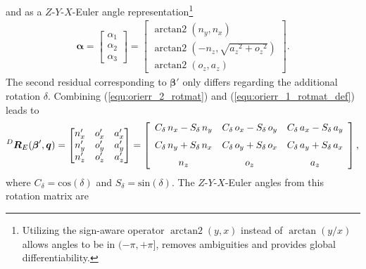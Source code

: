\documentclass[robotics,article,submit,moreauthors,pdftex]{Definitions/mdpi}
\newcommand{\bm}[1]{\boldsymbol{#1}}
\DeclareMathOperator{\arctantwo}{arctan2}
\newcommand{\rotmat}[2]{{{ }^{#1}\boldsymbol{R}}_{#2}}
\begin{document}
%
and as a $Z$-$Y$-$X$-Euler angle representation\footnote{Utilizing the sign-aware operator $\arctantwo(y,x)$ instead of $\arctan(y/x)$ allows angles to be in $(-\pi,+\pi]$, removes ambiguities and provides global differentiability.}
%
\begin{align}
    \bm{\alpha}
	=
	\begin{bmatrix}
	\alpha_1 \\
	\alpha_2 \\
	\alpha_3
    \end{bmatrix}
	=
    \begin{bmatrix}
        \arctantwo \left( {n_y} , { n_x} \right) \\ 
        \arctantwo \left( -{n_z} , \sqrt {{{a_z}}^{2}+{{ o_z}}^{2}} \right) \\ 
        \arctantwo \left( {o_z} , {a_z} \right)
    \end{bmatrix}.
    \label{equ:alpha_zyx}
\end{align}
%
The second residual corresponding to $\bm{\beta}'$ only differs regarding the additional rotation $\delta$. Combining (\ref{equ:orierr_2_rotmat}) and (\ref{equ:orierr_1_rotmat_def}) leads to
%
\begin{align}
    \rotmat{D}{E}(\bm{\beta}',\bm{q})
    =
    \begin{bmatrix}
    {n'_x}&{o'_x}&{a'_x} \\
    {n'_y}&{o'_y}&{a'_y} \\ 
    {n'_z}&{o'_z}&{a'_z} \\ 
    \end{bmatrix}
    = 
    \left[ \begin {array}{ccc} { C_{\delta}}\,{n_x}-{ S_{\delta}}\,{ n_y}&{ C_{\delta}}\,{o_x}-{ S_{\delta}}\,{o_y}&{ C_{\delta}}\,{ a_x}-{ S_{\delta}}\,{a_y}\\ \noalign{\medskip}{ C_{\delta}}\,{n_y}+ { S_{\delta}}\,{n_x}&{ C_{\delta}}\,{o_y}+{ S_{\delta}}\,{o_x}&{  C_{\delta}}\,{a_y}+{ S_{\delta}}\,{a_x}\\ \noalign{\medskip}{ n_z}&{o_z}&{a_z}\end {array} \right], \nonumber
\end{align}
%
where $C_{\delta}=\mathrm{cos}(\delta)$ and $S_{\delta}=\mathrm{sin}(\delta)$.
The $Z$-$Y$-$X$-Euler angles from this rotation matrix are
%
\end{document}
